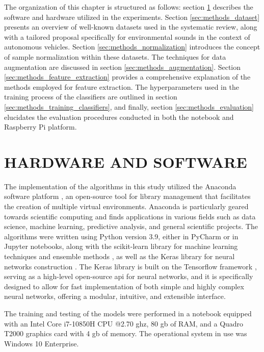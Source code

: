 The organization of this chapter is structured as follows: section \ref{sec:methods_HWSW} describes the software and hardware utilized in the experiments. Section \ref{sec:methods_dataset} presents an overview of well-known datasets used in the systematic review, along with a tailored proposal specifically for environmental sounds in the context of autonomous vehicles. Section \ref{sec:methods_normalization} introduces the concept of sample normalization within these datasets. The techniques for data augmentation are discussed in section \ref{sec:methods_augmentation}. Section \ref{sec:methods_feature_extraction} provides a comprehensive explanation of the methods employed for feature extraction. The hyperparameters used in the training process of the classifiers are outlined in section \ref{sec:methods_training_classifiers}, and finally, section \ref{sec:methods_evaluation} elucidates the evaluation procedures conducted in both the notebook and Raspberry Pi platform.


\section{HARDWARE AND SOFTWARE}
\label{sec:methods_HWSW}

The implementation of the algorithms in this study utilized the Anaconda software platform \cite{Anaconda86}, an open-source tool for library management that facilitates the creation of multiple virtual environments. Anaconda is particularly geared towards scientific computing and finds applications in various fields such as data science, machine learning, predictive analysis, and general scientific projects. The algorithms were written using Python version 3.9, either in PyCharm or in Jupyter notebooks, along with the scikit-learn library for machine learning techniques and ensemble methods \cite{scikitle61}, as well as the Keras library for neural networks construction \cite{KerasDee32}. The Keras library is built on the Tensorflow framework \cite{TensorFl23}, serving as a high-level open-source \gls{api} for neural networks, and it is specifically designed to allow for fast implementation of both simple and highly complex neural networks, offering a modular, intuitive, and extensible interface. 

The training and testing of the models were performed in a notebook equipped with an Intel\textregistered{} Core\texttrademark{} i7-10850H CPU @2.70 \gls{g}\gls{hz}, 80 \gls{g}\gls{b} of RAM, and a Quadro T2000 graphics card with 4 \gls{g}\gls{b} of memory. The operational system in use was Windows 10 Enterprise.

